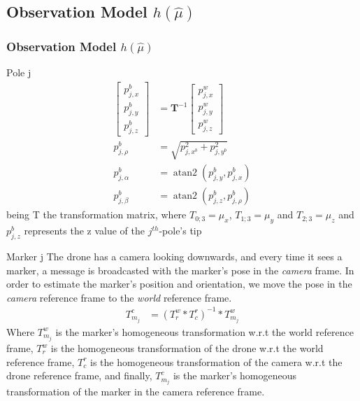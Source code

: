 \documentclass{beamer}
\DeclareMathOperator{\atantwo}{atan2}
\begin{document}
    \subsection{Observation Model $h \left( \hat\mu \right)$ }
    \begin{frame}
        \justifying
        \frametitle{Observation Model $h \left( \hat\mu \right)$}

        \begin{block}{Pole j}
            \begin{align*}
            \begin{bmatrix}
            p_{j, x}^b \\
            p_{j, y}^b \\
            p_{j, z}^b
            \end{bmatrix} &= \textbf{T}^{-1} \begin{bmatrix}
            p_{j, x}^w \\
            p_{j, y}^w \\
            p_{j, z}^w
            \end{bmatrix} \\
            p_{j,\rho}^b &= \sqrt{ p_{j, x^b}^2 + p_{j, y^b}^2 } \\
            p_{j, \alpha}^b &= \atantwo\left(p_{j, y}^b, p_{j, x}^b\right) \\
            p_{j, \beta}^b &= \atantwo\left(p_{j, z}^b, p_{j,\rho}^b\right)
            \end{align*}
            \tiny{being T the transformation matrix, where $T_{0; 3} = \mu_{x}$, $T_{1; 3} = \mu_{y}$ and $T_{2; 3} = \mu_{z}$ and $p_{j, z}^b$ represents the z value of the $j^{th}$-pole's tip}
        \end{block}
    \end{frame}

    \begin{frame}
        \begin{block}{Marker j}
            The drone has a camera looking downwards, and every time it sees a marker, a message is broadcasted with the marker's pose in the \textit{camera} frame. In order to estimate the marker's position and orientation, we move the pose in the \textit{camera} reference frame to the \textit{world} reference frame.
            \begin{align*}
                T_{m_j}^c &= (T_r^w * T_c^r)^{-1} * T_{m_j}^w
            \end{align*}
            Where $T_{m_j}^w$ is the marker's homogeneous transformation w.r.t the world reference frame, $T_r^w$ is the homogeneous transformation of the drone w.r.t the world reference frame, $T_c^r$ is the homogeneous transformation of the camera w.r.t the drone reference frame, and finally, $T_{m_j}^c$ is the marker's homogeneous transformation of the marker in the camera reference frame.
        \end{block}
    \end{frame}
\end{document}
